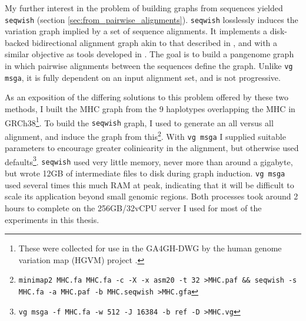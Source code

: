 My further interest in the problem of building graphs from sequences yielded {\tt seqwish} (section \ref{sec:from_pairwise_alignments}).
{\tt seqwish} losslessly induces the variation graph implied by a set of sequence alignments.
It implements a disk-backed bidirectional alignment graph akin to that described in \cite{kehr2014genome}, and with a similar objective as tools developed in \cite{jandrasits2018seq}.
The goal is to build a pangenome graph in which pairwise alignments between the sequences define the graph.
Unlike {\tt vg msga}, it is fully dependent on an input alignment set, and is not progressive.

As an exposition of the differing solutions to this problem offered by these two methods, I built the MHC graph from the 9 haplotypes overlapping the MHC in GRCh38\footnote{These were collected for use in the GA4GH-DWG by the human genome variation map (HGVM) project \cite{blow2015decoding}.}.
To build the {\tt seqwish} graph, I used \cite{li2018minimap2} to generate an all versus all alignment, and induce the graph from this\footnote{{\tt minimap2 MHC.fa MHC.fa -c -X -x asm20 -t 32 >MHC.paf \&\& seqwish -s MHC.fa -a MHC.paf -b MHC.seqwish >MHC.gfa}}.
With {\tt vg msga} I supplied suitable parameters to encourage greater coliniearity in the alignment, but otherwise used defaults\footnote{{\tt vg msga -f MHC.fa -w 512 -J 16384 -b ref -D >MHC.vg}}.
{\tt seqwish} used very little memory, never more than around a gigabyte, but wrote 12GB of intermediate files to disk during graph induction.
{\tt vg msga} used several times this much RAM at peak, indicating that it will be difficult to scale its application beyond small genomic regions.
Both processes took around 2 hours to complete on the 256GB/32vCPU server I used for most of the experiments in this thesis.

